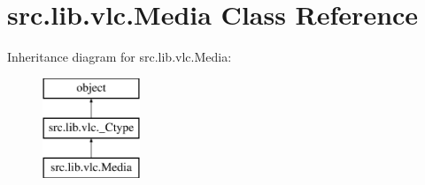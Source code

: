 \hypertarget{classsrc_1_1lib_1_1vlc_1_1Media}{}\section{src.\+lib.\+vlc.\+Media Class Reference}
\label{classsrc_1_1lib_1_1vlc_1_1Media}
Inheritance diagram for src.\+lib.\+vlc.\+Media\+:\begin{figure}[H]
\begin{center}
\leavevmode
\includegraphics[height=3.000000cm]{classsrc_1_1lib_1_1vlc_1_1Media}
\end{center}
\end{figure}
